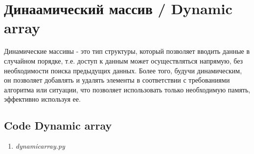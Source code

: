 
\section{Динаамический массив / Dynamic array}

Динамические массивы - это тип структуры, который позволяет вводить данные
в случайном порядке, т.е. доступ к данным может осуществляться напрямую,
без необходимости поиска предыдущих данных. Более того, будучи динамическим,
он позволяет добавлять и удалять элементы в соответствии с требованиями
алгоритма или ситуации, что позволяет использовать только необходимую память,
эффективно используя ее.

\subsection{Code Dynamic array}
\singlespace

\begin{enumerate}

  \item \textit{dynamicarray.py}

  

\end{enumerate}
